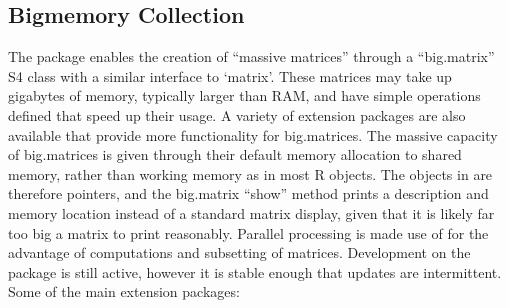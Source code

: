 \subsection{Bigmemory Collection}\label{subsec:bigmemory-collection}

The  package enables the creation of ``massive matrices''
through a ``big.matrix'' S4 class with a similar interface to
`matrix'\cite{kane13:bigmemory}. These matrices may take up gigabytes of
memory, typically larger than RAM, and have simple operations defined
that speed up their usage. A variety of extension packages are also
available that provide more functionality for big.matrices. The massive
capacity of big.matrices is given through their default memory
allocation to shared memory, rather than working memory as in most R
objects. The objects in \R{} are therefore pointers, and the big.matrix
``show'' method prints a description and memory location instead of a
standard matrix display, given that it is likely far too big a matrix to
print reasonably. Parallel processing is made use of for the advantage
of computations and subsetting of matrices. Development on the package
is still active, however it is stable enough that updates are
intermittent. Some of the main extension packages:

